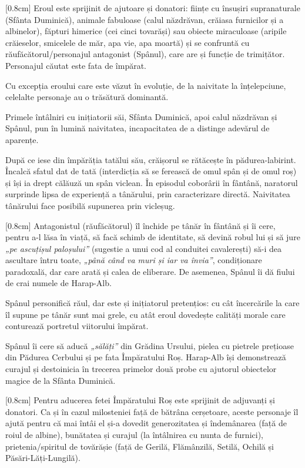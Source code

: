 [0.8cm]
Eroul este sprijinit de ajutoare și donatori: ființe cu însușiri supranaturale (Sfânta Duminică), animale fabuloase (calul năzdrăvan, crăiasa furnicilor și a albinelor), făpturi himerice (cei cinci tovarăși) sau obiecte miraculoase (aripile crăieselor, smicelele de măr, apa vie, apa moartă) și se confruntă cu răufăcătorul/personajul antagonist (Spânul), care are și funcție de trimițător. Personajul căutat este fata de împărat.

Cu excepția eroului care este văzut în evoluție, de la naivitate la înțelepciune, celelalte personaje au o trăsătură dominantă.

Primele întâlniri cu inițiatorii săi, Sfânta Duminică, apoi calul năzdrăvan și Spânul, pun în lumină naivitatea, incapacitatea de a distinge adevărul de aparențe.

După ce iese din împărăția tatălui său, crăișorul se rătăcește în pădurea-labirint. Încalcă sfatul dat de tată (interdicția să se ferească de omul spân și de omul roș) și își ia drept călăuză un spân viclean. În episodul coborârii în fântână, naratorul surprinde lipsa de experiență a tânărului, prin caracterizare directă. Naivitatea tânărului face posibilă supunerea prin vicleșug.

[0.8cm]
Antagonistul (răufăcătorul) îl închide pe tânăr în fântână și îi cere, pentru a-l lăsa în viață, să facă schimb de identitate, să devină robul lui și să jure \textit{„pe ascuțișul paloșului”} (sugestie a unui cod al conduitei cavalerești) să-i dea ascultare întru toate, \textit{„până când va muri și iar va învia”}, condiționare paradoxală, dar care arată și calea de eliberare. De asemenea, Spânul îi dă fiului de crai numele de Harap-Alb.

Spânul personifică răul, dar este și inițiatorul pretențios: cu cât încercările la care îl supune pe tânăr sunt mai grele, cu atât eroul dovedește calități morale care conturează portretul viitorului împărat.

Spânul îi cere să aducă \textit{„sălăți”} din Grădina Ursului, pielea cu pietrele prețioase din Pădurea Cerbului și pe fata Împăratului Roș. Harap-Alb își demonstrează curajul și destoinicia în trecerea primelor două probe cu ajutorul obiectelor magice de la Sfânta Duminică.

[0.8cm]
Pentru aducerea fetei Împăratului Roș este sprijinit de adjuvanți și donatori. Ca și în cazul milosteniei față de bătrâna cerșetoare, aceste personaje îl ajută pentru că mai întâi el și-a dovedit generozitatea și îndemânarea (față de roiul de albine), bunătatea și curajul (la întâlnirea cu nunta de furnici), prietenia/spiritul de tovărășie (față de Gerilă, Flămânzilă, Setilă, Ochilă și Păsări-Lăți-Lungilă).

